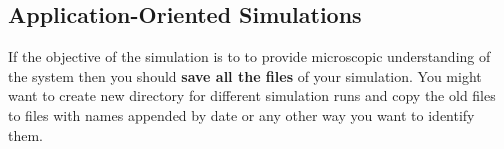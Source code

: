 \documentclass[12pt,letterpaper]{article}
\begin{document}
{{{{{{{\subsection{Application-Oriented Simulations} If the objective of
the simulation is to to provide microscopic understanding of the
system then you should {\bf save all the files} of your simulation. You
might want to create new directory for different simulation runs and
copy the old files to files with names appended by date or any other
way you want to identify them.











}}}}}}}
\end{document}
